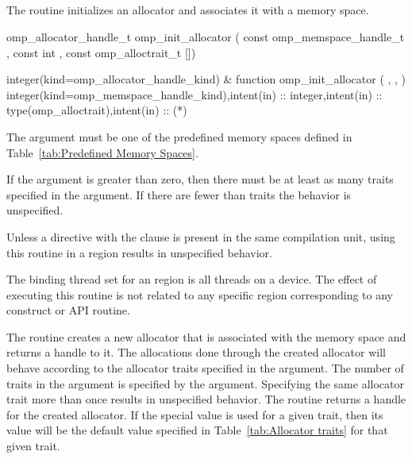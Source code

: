 \subsection{}
\label{subsec:omp_init_allocator}

\summary
The  routine initializes an allocator and associates it with a memory space.

\format
\begin{ccppspecific}
\begin{ompcFunction}
omp_allocator_handle_t omp_init_allocator ( const omp_memspace_handle_t , const int , const omp_alloctrait_t [])
\end{ompcFunction}
\end{ccppspecific}
\begin{fortranspecific}
\begin{ompfFunction}
integer(kind=omp_allocator_handle_kind) &
function omp_init_allocator ( , ,  )
integer(kind=omp_memspace_handle_kind),intent(in) :: 
integer,intent(in) :: 
type(omp_alloctrait),intent(in) :: (*)
\end{ompfFunction}
\end{fortranspecific}

\constraints

The  argument must be one of the predefined memory spaces defined in Table~\ref{tab:Predefined Memory Spaces}.

If the  argument is greater than zero, then there must be at least as many traits
specified in the  argument. If there are fewer than  traits the behavior is
unspecified.

Unless a  directive with the  clause is present in the same compilation unit, using this routine in a  region results in unspecified behavior.

\binding

The binding thread set for an  region is all threads on a device.
The effect of executing this routine is not related to any specific region corresponding to any construct or API routine.

\effect

The  routine creates a new allocator that is associated with the  memory space and returns a handle to it. 
The allocations done through the created allocator will behave according to the allocator traits specified in the  argument.  The number of traits in the  argument is specified by the  argument. Specifying the same allocator trait more than once results in unspecified behavior. The routine returns a handle for the created allocator. If the special  value is used for a given trait, then its value will be the default value specified in Table~\ref{tab:Allocator traits} for that given trait.

